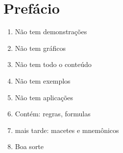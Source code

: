 \chapter*{Prefácio}

\begin{enumerate}
    \item Não tem demonstrações
    \item Não tem gráficos
    \item Não tem todo o conteúdo
    \item Não tem exemplos
    \item Não tem aplicações
    \item Contém: regras, formulas
    \item mais tarde: macetes e mnemônicos
    \item Boa sorte
\end{enumerate}